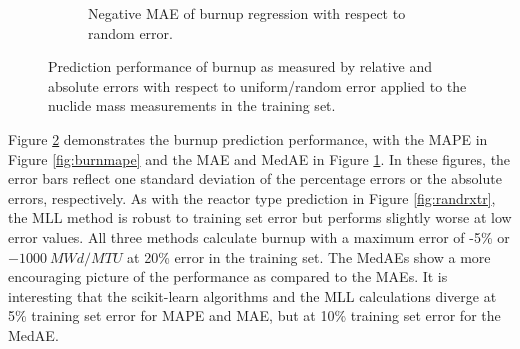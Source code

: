 \begin{figure}[!htb]
\begin{subfigure}[b]{0.5\textwidth}
    \caption{Negative \gls{MAE} of burnup regression with respect to 
             random error.}
    \label{fig:burnmae}
  \end{subfigure}
  \caption{Prediction performance of burnup as measured by relative and 
           absolute errors with respect to uniform/random error applied to the 
           nuclide mass measurements in the training set.}
  \label{fig:randburn}
\end{figure}

Figure \ref{fig:randburn} demonstrates the burnup prediction performance, with
the \gls{MAPE} in Figure \ref{fig:burnmape} and the \gls{MAE} and \gls{MedAE}
in Figure \ref{fig:burnmae}. In these figures, the error bars reflect one
standard deviation of the percentage errors or the absolute errors,
respectively.  As with the reactor type prediction in Figure
\ref{fig:randrxtr}, the \gls{MLL} method is robust to training set error but
performs slightly worse at low error values.  All three methods calculate
burnup with a maximum error of -5\% or $-1000\:MWd/MTU$ at 20\% error in the
training set. The \gls{MedAE}s show a more encouraging picture of the
performance as compared to the \gls{MAE}s. It is interesting that the
scikit-learn algorithms and the \gls{MLL} calculations diverge at 5\% training
set error for \gls{MAPE} and \gls{MAE}, but at 10\% training set error for the
\gls{MedAE}.

